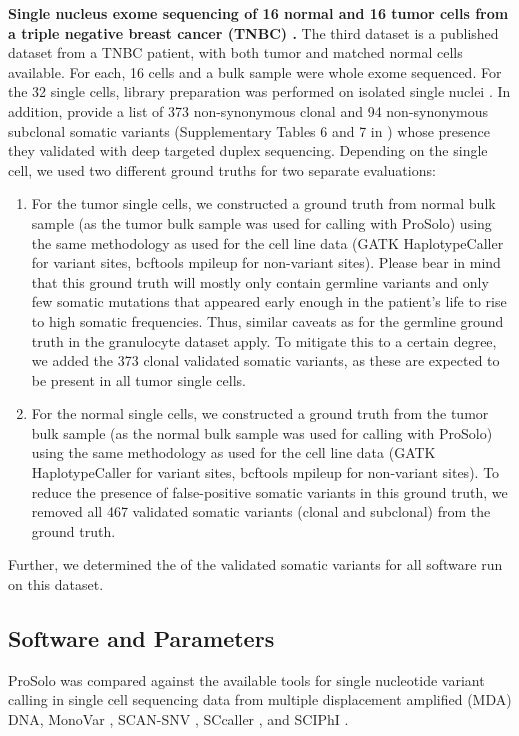 \documentclass[authoryear,preprint,11pt]{scrartcl}
\begin{document}
\textbf{Single nucleus exome sequencing of 16 normal and 16 tumor cells from a triple negative breast cancer (TNBC) \citep{wang_clonal_2014}.}
The third dataset is a published dataset from a TNBC patient, with both tumor and matched normal cells available.
For each, 16 cells and a bulk sample were whole exome sequenced.
For the 32 single cells, library preparation was performed on isolated single nuclei \citep{wang_clonal_2014}.
In addition, \cite{wang_clonal_2014} provide a list of 373 non-synonymous clonal and 94 non-synonymous subclonal somatic variants (Supplementary Tables 6 and 7 in \cite{wang_clonal_2014}) whose presence they validated with deep targeted duplex sequencing.
Depending on the single cell, we used two different ground truths for two separate evaluations:
\begin{enumerate}
    \item For the tumor single cells, we constructed a ground truth from normal bulk sample (as the tumor bulk sample was used for calling with ProSolo) using the same methodology as used for the cell line data (GATK HaplotypeCaller for variant sites, bcftools mpileup for non-variant sites).
    Please bear in mind that this ground truth will mostly only contain germline variants and only few somatic mutations that appeared early enough in the patient's life to rise to high somatic frequencies.
    Thus, similar caveats as for the germline ground truth in the granulocyte dataset apply.
    To mitigate this to a certain degree, we added the 373 clonal validated somatic variants, as these are expected to be present in all tumor single cells.
    \item For the normal single cells, we constructed a ground truth from the tumor bulk sample (as the normal bulk sample was used for calling with ProSolo) using the same methodology as used for the cell line data (GATK HaplotypeCaller for variant sites, bcftools mpileup for non-variant sites).
    To reduce the presence of false-positive somatic variants in this ground truth, we removed all 467 validated somatic variants (clonal and subclonal) from the ground truth.
\end{enumerate}
Further, we determined the of the validated somatic variants for all software run on this dataset.


\subsection{Software and Parameters}

ProSolo was compared against the available tools for single nucleotide variant calling in single cell sequencing data from multiple displacement amplified (MDA) DNA, MonoVar \citep{zafar_monovar:_2016}, SCAN-SNV \citep{luquette_identification_2019}, SCcaller \citep{dong_accurate_2017}, and SCIPhI \citep{singer_single-cell_2018}.\\
\end{document}
